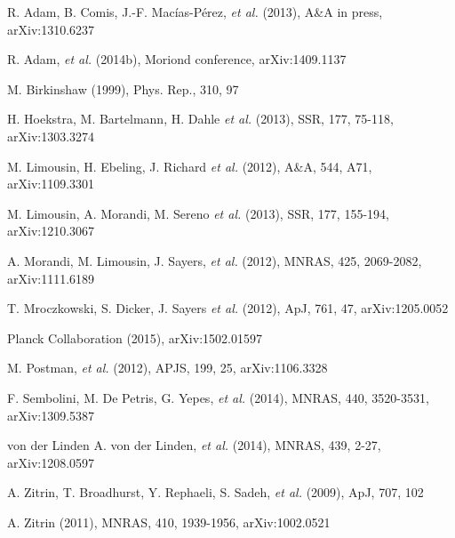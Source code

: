 \documentclass[11pt,a4paper,twoside,graphicx,color]{article}
\begin{document}
\begin{thebibliography}{9}

R. Adam, B. Comis, J.-F. Mac\'ias-P\'erez, {\it et al.} (2013), A\&A in press, arXiv:1310.6237
 
R. Adam, {\it et al.} (2014b), Moriond conference, arXiv:1409.1137

M. Birkinshaw (1999), Phys. Rep., 310, 97

H. Hoekstra, M. Bartelmann, H. Dahle {\it et al.} (2013), SSR, 177, 75-118, arXiv:1303.3274

M. Limousin, H. Ebeling, J. Richard {\it et al.} (2012), A\&A, 544, A71, arXiv:1109.3301

M. Limousin, A. Morandi, M. Sereno {\it et al.} (2013), SSR, 177, 155-194, arXiv:1210.3067

A. Morandi, M. Limousin, J. Sayers, {\it et al.} (2012), MNRAS, 425, 2069-2082, arXiv:1111.6189

T. Mroczkowski, S. Dicker, J. Sayers {\it et al.} (2012), ApJ, 761, 47, arXiv:1205.0052

Planck Collaboration  (2015), arXiv:1502.01597

M. Postman, {\it et al.} (2012), APJS, 199, 25, arXiv:1106.3328

F. Sembolini, M. De Petris, G. Yepes, {\it et al.} (2014), MNRAS, 440, 3520-3531, arXiv:1309.5387

von der Linden
A. von der Linden, {\it et al.} (2014), MNRAS, 439, 2-27, arXiv:1208.0597
	
A. Zitrin, T. Broadhurst, Y. Rephaeli, S. Sadeh, {\it et al.} (2009), ApJ, 707, 102

A. Zitrin (2011), MNRAS, 410, 1939-1956, arXiv:1002.0521

\end{thebibliography}
\end{document}
